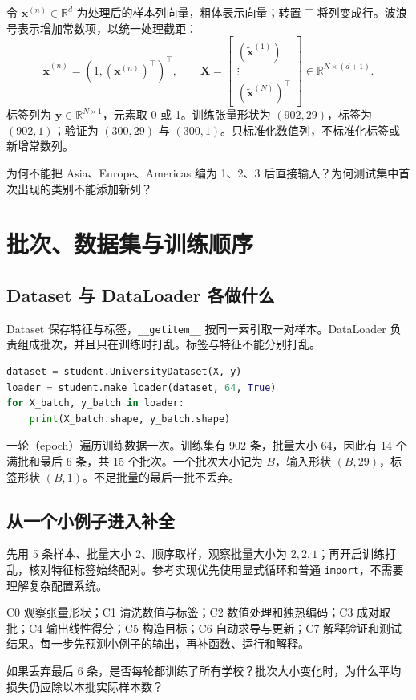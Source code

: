 \documentclass[UTF8,a4paper,11pt,fontset=fandol]{ctexart}
\begin{document}
令 $\mathbf x^{(n)}\in\mathbb R^d$ 为处理后的样本列向量，粗体表示向量；转置 $\top$ 将列变成行。波浪号表示增加常数项，以统一处理截距：
\begin{equation}
\tilde{\mathbf x}^{(n)}=(1,(\mathbf x^{(n)})^\top)^\top,\qquad
\mathbf X=\begin{bmatrix}(\tilde{\mathbf x}^{(1)})^\top\\\vdots\\(\tilde{\mathbf x}^{(N)})^\top\end{bmatrix}\in\mathbb R^{N\times(d+1)}.
\end{equation}
标签列为 $\mathbf y\in\mathbb R^{N\times1}$，元素取 0 或 1。训练张量形状为 $(902,29)$，标签为 $(902,1)$；验证为 $(300,29)$ 与 $(300,1)$。只标准化数值列，不标准化标签或新增常数列。
\begin{questionbox}[C2：编码自查]
为何不能把 Asia、Europe、Americas 编为 1、2、3 后直接输入？为何测试集中首次出现的类别不能添加新列？
\end{questionbox}
\clearpage
\section{批次、数据集与训练顺序}
\subsection{Dataset 与 DataLoader 各做什么}
Dataset 保存特征与标签，\texttt{\_\_getitem\_\_} 按同一索引取一对样本。DataLoader 负责组成批次，并且只在训练时打乱。标签与特征不能分别打乱。
\begin{lstlisting}[language=Python]
dataset = student.UniversityDataset(X, y)
loader = student.make_loader(dataset, 64, True)
for X_batch, y_batch in loader:
    print(X_batch.shape, y_batch.shape)
\end{lstlisting}
一轮（epoch）遍历训练数据一次。训练集有 902 条，批量大小 64，因此有 14 个满批和最后 6 条，共 15 个批次。一个批次大小记为 $B$，输入形状 $(B,29)$，标签形状 $(B,1)$。不足批量的最后一批不丢弃。
\subsection{从一个小例子进入补全}
先用 5 条样本、批量大小 2、顺序取样，观察批量大小为 $2,2,1$；再开启训练打乱，核对特征标签始终配对。参考实现优先使用显式循环和普通 \texttt{import}，不需要理解复杂配置系统。
\begin{teacherbox}[代码阅读节奏]
C0 观察张量形状；C1 清洗数值与标签；C2 数值处理和独热编码；C3 成对取批；C4 输出线性得分；C5 构造目标；C6 自动求导与更新；C7 解释验证和测试结果。每一步先预测小例子的输出，再补函数、运行和解释。
\end{teacherbox}
\begin{questionbox}[C3：为什么保留末批]
如果丢弃最后 6 条，是否每轮都训练了所有学校？批次大小变化时，为什么平均损失仍应除以本批实际样本数？
\end{questionbox}
\clearpage
\end{document}
